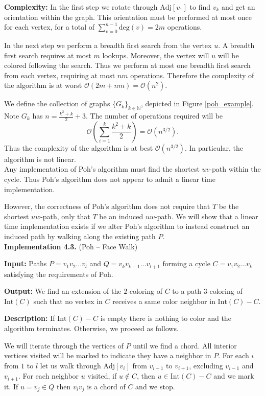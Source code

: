 \documentclass[letterpaper, 12pt]{article}
\theoremstyle{definition}
\theoremstyle{definition}
\theoremstyle{thm}
\theoremstyle{definition}
\begin{document}
\noindent\textbf{Complexity:} In the first step we rotate through
$\text{Adj}[v_1]$ to find $v_k$ and get an orientation within the graph. This
orientation must be performed at most once for each vertex, for a total of
$\sum_{v=0}^{n-1}\text{deg}(v)=2m$ operations.

In the next step we perform a breadth first search from the vertex $u$.
A breadth first search requires at most $m$ lookups. Moreover, the vertex will
$u$ will be colored following the search. Thus we perform at most one breadth
first search from each vertex, requiring at most $nm$ operations.
Therefore the complexity of the algorithm is at worst
$\mathcal{O}(2m + nm)=\mathcal{O}(n^2)$.

We define the collection of graphs $\{G_k\}_{k\in\mathbb{N}}$, depicted in
Figure \ref{poh_example}.
Note $G_k$ has $n=\frac{k^2+k}{2}+3$. The number of operations required will be
\[
    \mathcal{O}\left(\sum_{i=1}^k \frac{k^2+k}{2}\right)=\mathcal{O}(n^{3/2}).
\]
Thus the complexity of the algorithm is at best $\mathcal{O}(n^{3/2})$. In
particular, the algorithm is not linear.\\

Any implementation of Poh's algorithm must find the shortest $uv$-path within
the cycle. Thus Poh's algorithm does not appear to admit a linear time
implementation.

However, the correctness of Poh's algorithm does not require that $T$
be the shortest $uw$-path, only that $T$ be an induced $uw$-path. We will show
that a linear time implementation exists if we alter Poh's algorithm to instead
construct an induced path by walking along the existing path $P$.\\

\noindent\textbf{Implementation 4.3.} (Poh -- Face Walk)

\noindent\textbf{Input:} Paths $P=v_1v_2\ldots v_l$ and
$Q=v_kv_{k-1}\ldots v_{l+1}$ forming a cycle $C=v_1v_2\ldots v_k$ satisfying
the requirements of Poh.

\noindent\textbf{Output:} We find an extension of the $2$-coloring of $C$ to
a path $3$-coloring of $\text{Int}(C)$ such that
no vertex in $C$ receives a same color neighbor in $\text{Int}(C)-C$.

\noindent\textbf{Description:} If $\text{Int}(C)-C$ is empty there is nothing to
color and the algorithm terminates. Otherwise, we proceed as follows.

We will iterate through the vertices of $P$ until we find a chord. All interior
vertices visited will be marked to indicate they have a neighbor in $P$. For
each $i$ from $1$ to $l$ let us walk through
$\text{Adj}[v_i]$ from $v_{i-1}$ to $v_{i+1}$, excluding
$v_{i-1}$ and $v_{i+1}$. For each neighbor $u$ visited,
if $u\not\in C$, then $u\in \text{Int}(C)-C$ and we
mark it. If $u=v_j\in Q$ then $v_iv_j$ is a chord of $C$ and we stop.
\end{document}
